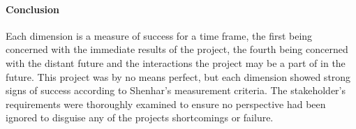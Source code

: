\paragraph{Conclusion}
Each dimension is a measure of success for a time frame, the first being concerned with the immediate results of the project, the fourth being concerned with the distant future and the interactions the project may be a part of in the future. This project was by no means perfect, but each dimension showed strong signs of success according to Shenhar's measurement criteria. The stakeholder's requirements were thoroughly examined to ensure no perspective had been ignored to disguise any of the projects shortcomings or failure.

